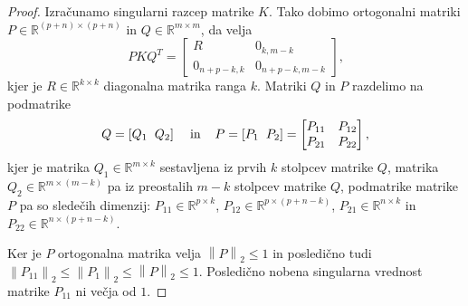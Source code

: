 \documentclass[mat1]{article}
\newcommand{\norm}[1]{\left\lVert#1\right\rVert}
\begin{document}
\begin{proof}
Izračunamo singularni razcep matrike  $K$. Tako dobimo ortogonalni matriki $P \in \mathbb{R}^{(p+n) \times (p+n)}$ in $Q \in \mathbb{R}^{m \times m}$, da velja 
\begin{equation} P K Q^T = 
\begin{bmatrix} 
R & 0_{k, m-k} \\
0_{n+p-k, k} & 0_{n+p-k, m-k} 
\end{bmatrix} \text{,} \label{eq:5}
\end{equation}
kjer je $R \in \mathbb{R}^{k \times k}$ diagonalna matrika ranga $k$. Matriki $Q$ in $P$ razdelimo na podmatrike
$$  Q = \left[Q_1 \hspace{2mm} Q_2 \right]
\hspace{4mm} \text{in} \hspace{4mm}
P = \left[P_1 \hspace{2mm} P_2 \right]
=
\begin{bmatrix} 
P_{11} & P_{12} \\
P_{21} & P_{22} 
\end{bmatrix},
$$
kjer je matrika $Q_1 \in \mathbb{R}^{m \times k}$ sestavljena iz prvih $k$ stolpcev matrike $Q$, matrika $Q_2 \in \mathbb{R}^{m \times (m-k)}$ pa iz preostalih $m-k$ stolpcev matrike $Q$, podmatrike matrike $P$ pa so sledečih dimenzij: $P_{11} \in \mathbb{R}^{p \times k}$, $P_{12} \in \mathbb{R}^{p \times (p+n-k)}$, $P_{21} \in \mathbb{R}^{n \times k}$ in $P_{22} \in \mathbb{R}^{n \times (p+n-k)}$.

Ker je $P$ ortogonalna matrika velja $\norm{P}_2 \leq 1$ in posledično tudi $\norm{P_{11}}_2 \leq \norm{P_{1}}_2 \leq \norm{P}_2 \leq 1$. Posledično nobena singularna vrednost matrike $P_{11}$ ni večja od $1$. %


\end{proof}
\end{document}
